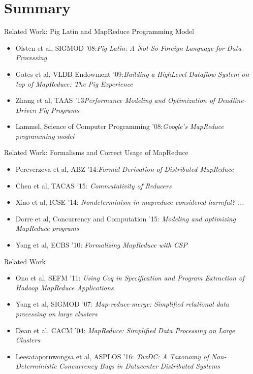 \section*{Summary}

\begin{frame}{Related Work: Pig Latin and MapReduce Programming Model}
  \begin{itemize}
    \item Olsten et al, SIGMOD '08:\emph{Pig Latin: A Not-So-Foreign Language for Data Processing}
	\item Gates et al, VLDB Endowment '09:\emph{Building a HighLevel Dataflow System on top of MapReduce: The Pig Experience}
	\item Zhang et al, TAAS '13\emph{Performance Modeling and Optimization of Deadline-Driven Pig Programs}
	\item Lammel, Science of Computer Programming '08:\emph{Google's MapReduce programming model}
  \end{itemize}
\end{frame}

\begin{frame}{Related Work: Formalisms and Correct Usage of MapReduce}
  \begin{itemize}
	\item Pereverzeva et al, ABZ '14:\emph{Formal Derivation of Distributed MapReduce}
    \item Chen et al, TACAS '15: \emph{Commutativity of Reducers}
    \item Xiao et al, ICSE '14: \emph{Nondeterminism in mapreduce considered harmful? ...}
    \item Dorre et al, Concurrency and Computation '15: \emph{Modeling and optimizing MapReduce programs}
    \item Yang et al, ECBS '10: \emph{Formalizing MapReduce with CSP}
  \end{itemize}
\end{frame}

\begin{frame}{Related Work}
  \begin{itemize}
    \item Ono et al, SEFM '11: \emph{Using Coq in Specification and Program Extraction of Hadoop MapReduce Applications}
    \item Yang et al, SIGMOD '07: \emph{Map-reduce-merge: Simplified relational data processing on large clusters}
   	\item Dean et al, CACM '04: \emph{MapReduce: Simplified Data Processing on Large Clusters}
   	\item Leesatapornwongsa et al, ASPLOS '16: \emph{TaxDC: A Taxonomy of Non-Deterministic Concurrency Bugs in Datacenter Distributed Systems}
  \end{itemize}
\end{frame}


